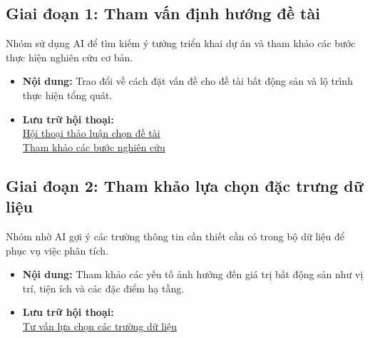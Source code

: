 \documentclass[12pt, a4paper]{article}
\begin{document}
\subsection{Giai đoạn 1: Tham vấn định hướng đề tài}
Nhóm sử dụng AI để tìm kiếm ý tưởng triển khai dự án và tham khảo các bước thực hiện nghiên cứu cơ bản.
\begin{itemize}[label=$\bullet$]
    \item \textbf{Nội dung:} Trao đổi về cách đặt vấn đề cho đề tài bất động sản và lộ trình thực hiện tổng quát.
    \item \textbf{Lưu trữ hội thoại:} \\
    \href{https://aistudio.google.com/app/prompts?state=%7B%22ids%22:%5B%2216fV2CYTTRMIDJKNbg_ydAXpNiobBe0MH%22%5D,%22action%22:%22open%22,%22userId%22:%22103260168952391043836%22,%22resourceKeys%22:%7B%7D%7D&usp=sharing}{Hội thoại thảo luận chọn đề tài} \\
    \href{https://aistudio.google.com/app/prompts?state=%7B%22ids%22:%5B%221BtG7_MjMMbGiqNV00Tu6_paHklaXeqQB%22%5D,%22action%22:%22open%22,%22userId%22:%22103260168952391043836%22,%22resourceKeys%22:%7B%7D%7D&usp=sharing}{Tham khảo các bước nghiên cứu}
\end{itemize}

\subsection{Giai đoạn 2: Tham khảo lựa chọn đặc trưng dữ liệu}
Nhóm nhờ AI gợi ý các trường thông tin cần thiết cần có trong bộ dữ liệu để phục vụ việc phân tích.
\begin{itemize}[label=$\bullet$]
    \item \textbf{Nội dung:} Tham khảo các yếu tố ảnh hưởng đến giá trị bất động sản như vị trí, tiện ích và các đặc điểm hạ tầng.
    \item \textbf{Lưu trữ hội thoại:} \\
    \href{https://aistudio.google.com/app/prompts?state=%7B%22ids%22:%5B%221zWIU1WWr-gP229cYPvjBAAo7PbS95-xr%22%5D,%22action%22:%22open%22,%22userId%22:%22103260168952391043836%22,%22resourceKeys%22:%7B%7D%7D&usp=sharing}{Tư vấn lựa chọn các trường dữ liệu}
\end{itemize}
\end{document}
